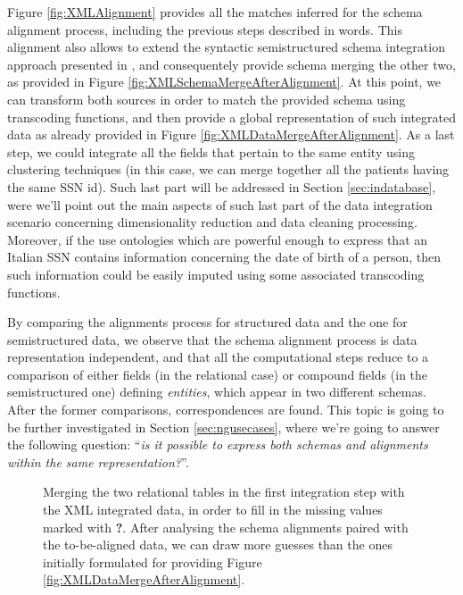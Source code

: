 Figure \ref{fig:XMLAlignment} provides all the matches inferred for the schema  alignment process, including the previous steps described in words. This alignment also allows to extend the syntactic semistructured schema integration approach presented in  \cite{BaaziziLCGS17}, and consequentely provide schema merging the other two, as provided in Figure \ref{fig:XMLSchemaMergeAfterAlignment}. At this point, we can transform both sources in order to match the provided schema using transcoding functions, and then provide a global representation of such integrated data as already provided in Figure \vref{fig:XMLDataMergeAfterAlignment}. As a last step, we could integrate all the fields that pertain to the same entity using clustering techniques (in this case, we can merge together all the patients having the same SSN id). Such last part  will be addressed in Section \ref{sec:indatabase}, were we'll point out the main aspects of such last part of the data integration scenario concerning dimensionality reduction and data cleaning processing. Moreover, if the use ontologies which are powerful enough to express that an Italian SSN contains information concerning the date of birth of a person, then such information could be easily imputed using some associated transcoding functions.

By comparing the alignments  process for structured data and the one for semistructured data, we observe that the schema alignment process is  data representation independent, and that all the computational steps reduce to a comparison of either fields (in the relational case) or compound fields (in the semistructured one) defining \textit{entities}, which appear in two different schemas. After the former comparisons, correspondences are found.%
This topic is going to be further investigated in Section \vref{sec:ngusecases}, where we're going to answer the following question: ``\textit{is it possible to express both schemas and alignments within the same representation?}''.

\begin{figure}
  
  \caption{Merging the two relational tables in the first integration step with the XML integrated data, in order to fill in the missing values marked with {\color{red}\textbf{?}}. After analysing the schema alignments paired with the to-be-aligned data, we can draw more guesses than the ones initially formulated for providing Figure \vref{fig:XMLDataMergeAfterAlignment}.}
  \label{fig:XMLDataMergeWithTheTwoTables}
\end{figure}

